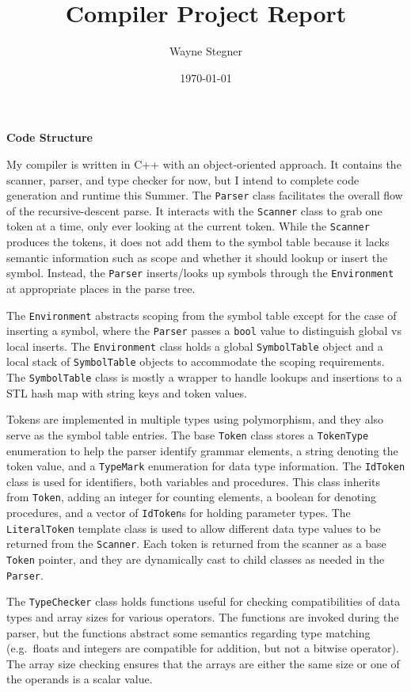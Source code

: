 \documentclass[letterpaper, 12pt, titlepage]{article}
\title{Compiler Project Report}
\author{
	Wayne Stegner
}
\date{
	\today
}
\begin{document}
	\maketitle
	\par \textbf{Code Structure}
	\par My compiler is written in C++ with an object-oriented approach.
	It contains the scanner, parser, and type checker for now, but I intend to
	complete code generation and runtime this Summer.
	The \texttt{Parser} class facilitates the overall flow of the
	recursive-descent parse.
	It interacts with the \texttt{Scanner} class to grab one token at a time,
	only ever looking at the current token.
	While the \texttt{Scanner} produces the tokens, it does not add them to the
	symbol table because it lacks semantic information such as scope and whether
	it should lookup or insert the symbol.
	Instead, the \texttt{Parser} inserts/looks up symbols through the
	\texttt{Environment} at appropriate places in the parse tree.
	\par The \texttt{Environment} abstracts scoping from the symbol table except
	for the case of inserting a symbol, where the \texttt{Parser} passes a
	\texttt{bool} value to distinguish global vs local inserts.
	The \texttt{Environment} class holds a global \texttt{SymbolTable} object and
	a local stack of \texttt{SymbolTable} objects to accommodate the scoping
	requirements.
	The \texttt{SymbolTable} class is mostly a wrapper to handle lookups and
	insertions to a STL hash map with string keys and token values.

	\par Tokens are implemented in multiple types using polymorphism, and they also
	serve as the symbol table entries.
	The base \texttt{Token} class stores a \texttt{TokenType} enumeration to help
	the parser identify grammar elements, a string denoting the token value, and a
	\texttt{TypeMark} enumeration for data type information.
	The \texttt{IdToken} class is used for identifiers, both variables and
	procedures.
	This class inherits from \texttt{Token}, adding an integer for counting
	elements, a boolean for denoting procedures, and a vector of \texttt{IdToken}s
	for holding parameter types.
	The \texttt{LiteralToken} template class is used to allow different data
	type values to be returned from the \texttt{Scanner}.
	Each token is returned from the scanner as a base \texttt{Token} pointer, and
	they are dynamically cast to child classes as needed in the \texttt{Parser}.

	\par The \texttt{TypeChecker} class holds functions useful for checking
	compatibilities of data types and array sizes for various operators.
	The functions are invoked during the parser, but the functions abstract some
	semantics regarding type matching (e.g.\ floats and integers are compatible
	for addition, but not a bitwise operator).
	The array size checking ensures that the arrays are either the same size or
	one of the operands is a scalar value.
\end{document}
